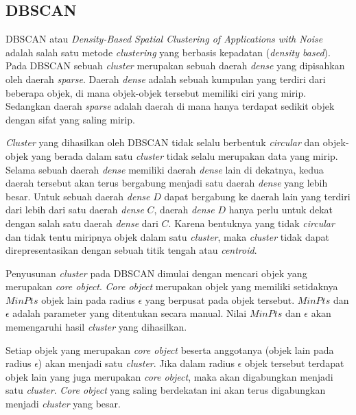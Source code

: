 \subsection{DBSCAN}
\label{subsec:clustering_dbscan}
DBSCAN atau \textit{Density-Based Spatial Clustering of Applications with Noise} adalah salah satu metode \textit{clustering} yang berbasis kepadatan (\textit{density based}). Pada DBSCAN sebuah \textit{cluster} merupakan sebuah daerah \textit{dense} yang dipisahkan oleh daerah \textit{sparse}. Daerah \textit{dense} adalah sebuah kumpulan yang terdiri dari beberapa objek, di mana objek-objek tersebut memiliki ciri yang mirip. Sedangkan daerah \textit{sparse} adalah daerah di mana hanya terdapat sedikit objek dengan sifat yang saling mirip.

\textit{Cluster} yang dihasilkan oleh DBSCAN tidak selalu berbentuk \textit{circular} dan objek-objek yang berada dalam satu \textit{cluster} tidak selalu merupakan data yang mirip. Selama sebuah daerah \textit{dense} memiliki daerah \textit{dense} lain di dekatnya, kedua daerah tersebut akan terus bergabung menjadi satu daerah \textit{dense} yang lebih besar. Untuk sebuah daerah \textit{dense} $D$ dapat bergabung ke daerah lain yang terdiri dari lebih dari satu daerah \textit{dense} $C$, daerah \textit{dense} $D$ hanya perlu untuk dekat dengan salah satu daerah \textit{dense} dari $C$. Karena bentuknya yang tidak \textit{circular} dan tidak tentu miripnya objek dalam satu \textit{cluster}, maka \textit{cluster} tidak dapat direpresentasikan dengan sebuah titik tengah atau \textit{centroid}.

Penyusunan \textit{cluster} pada DBSCAN dimulai dengan mencari objek yang merupakan \textit{core object}. \textit{Core object} merupakan objek yang memiliki setidaknya $MinPts$ objek lain pada radius $\epsilon$ yang berpusat pada objek tersebut. $MinPts$ dan $\epsilon$ adalah parameter yang ditentukan secara manual. Nilai $MinPts$ dan $\epsilon$ akan memengaruhi hasil \textit{cluster} yang dihasilkan.

Setiap objek yang merupakan \textit{core object} beserta anggotanya (objek lain pada radius $\epsilon$) akan menjadi satu \textit{cluster}. Jika dalam radius $\epsilon$ objek tersebut terdapat objek lain yang juga merupakan \textit{core object}, maka akan digabungkan menjadi satu \textit{cluster}. \textit{Core object} yang saling berdekatan ini akan terus digabungkan menjadi \textit{cluster} yang besar.

